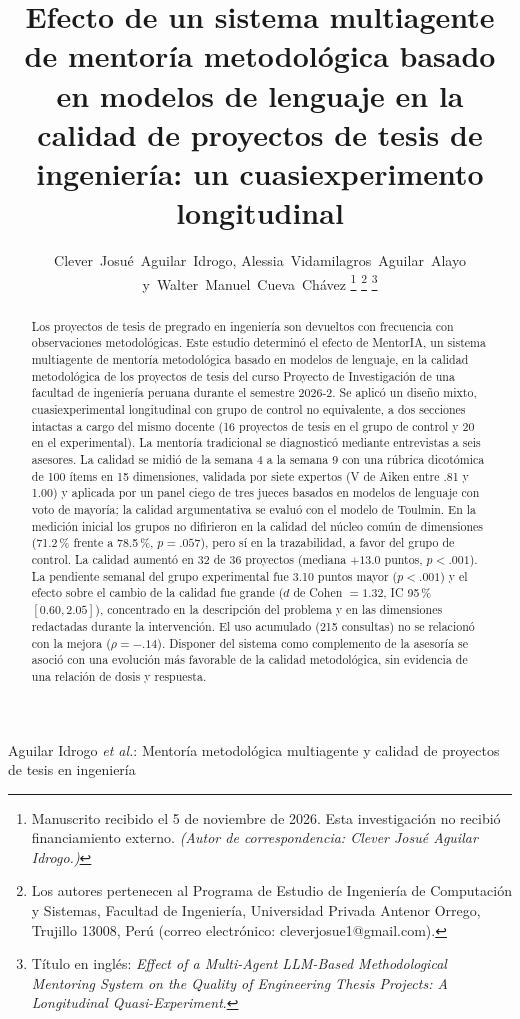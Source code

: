 \documentclass[journal]{IEEEtran}
\begin{document}
\title{Efecto de un sistema multiagente de mentoría metodológica basado en modelos de lenguaje en la calidad de proyectos de tesis de ingeniería: un cuasiexperimento longitudinal}

\author{Clever~Josu\'e~Aguilar~Idrogo,
        Alessia~Vidamilagros~Aguilar~Alayo
        y~Walter~Manuel~Cueva~Ch\'avez%
\thanks{Manuscrito recibido el 5 de noviembre de 2026. Esta investigación no recibió financiamiento externo. \textit{(Autor de correspondencia: Clever Josu\'e Aguilar Idrogo.)}}%
\thanks{Los autores pertenecen al Programa de Estudio de Ingeniería de Computación y Sistemas, Facultad de Ingeniería, Universidad Privada Antenor Orrego, Trujillo 13008, Perú (correo electrónico: cleverjosue1@gmail.com).}%
\thanks{Título en inglés: \emph{Effect of a Multi-Agent LLM-Based Methodological Mentoring System on the Quality of Engineering Thesis Projects: A Longitudinal Quasi-Experiment}.}}

%
{Aguilar Idrogo \MakeLowercase{\textit{et al.}}: Mentoría metodológica multiagente y calidad de proyectos de tesis en ingeniería}

\maketitle

\begin{abstract}
Los proyectos de tesis de pregrado en ingeniería son devueltos con frecuencia con observaciones metodológicas. Este estudio determinó el efecto de MentorIA, un sistema multiagente de mentoría metodológica basado en modelos de lenguaje, en la calidad metodológica de los proyectos de tesis del curso Proyecto de Investigación de una facultad de ingeniería peruana durante el semestre 2026-2. Se aplicó un diseño mixto, cuasiexperimental longitudinal con grupo de control no equivalente, a dos secciones intactas a cargo del mismo docente (16 proyectos de tesis en el grupo de control y 20 en el experimental). La mentoría tradicional se diagnosticó mediante entrevistas a seis asesores. La calidad se midió de la semana 4 a la semana 9 con una rúbrica dicotómica de 100 ítems en 15 dimensiones, validada por siete expertos (V de Aiken entre .81 y 1.00) y aplicada por un panel ciego de tres jueces basados en modelos de lenguaje con voto de mayoría; la calidad argumentativa se evaluó con el modelo de Toulmin. En la medición inicial los grupos no difirieron en la calidad del núcleo común de dimensiones (71.2\,\% frente a 78.5\,\%, $p = .057$), pero sí en la trazabilidad, a favor del grupo de control. La calidad aumentó en 32 de 36 proyectos (mediana $+13.0$ puntos, $p < .001$). La pendiente semanal del grupo experimental fue 3.10 puntos mayor ($p < .001$) y el efecto sobre el cambio de la calidad fue grande ($d$ de Cohen $= 1.32$, IC 95\,\% $[0.60, 2.05]$), concentrado en la descripción del problema y en las dimensiones redactadas durante la intervención. El uso acumulado (215 consultas) no se relacionó con la mejora ($\rho = -.14$). Disponer del sistema como complemento de la asesoría se asoció con una evolución más favorable de la calidad metodológica, sin evidencia de una relación de dosis y respuesta.
\end{abstract}
\end{document}
